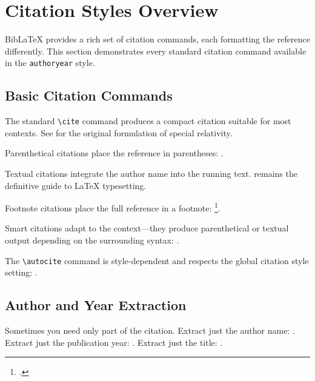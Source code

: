 \documentclass[
    language=english,
    doctype=article,
    institution=none,
]{../../omnilatex}
\begin{document}
\maketitle

\tableofcontents

\section{Citation Styles Overview}
\label{sec:citation-styles}

BibLaTeX provides a rich set of citation commands, each formatting the
reference differently.  This section demonstrates every standard citation
command available in the \texttt{authoryear} style.

\subsection{Basic Citation Commands}

The standard \verb|\cite| command produces a compact citation suitable for
most contexts.  See \cite{einstein1905} for the original formulation of
special relativity.

Parenthetical citations place the reference in parentheses:
\parencite{knuthTeXbook1986}.

Textual citations integrate the author name into the running text.
\textcite{goossensLaTeXCompanion1993} remains the definitive guide to
\LaTeX{} typesetting.

Footnote citations place the full reference in a footnote:
\footcite{mckinneyPythonDataAnalysis2018}.

Smart citations adapt to the context---they produce parenthetical or
textual output depending on the surrounding syntax:
\smartcite{ramalhoFluentPython2015}.

The \verb|\autocite| command is style-dependent and respects the global
citation style setting: \autocite{birdNaturalLanguageProcessing2009}.

\subsection{Author and Year Extraction}

Sometimes you need only part of the citation.  Extract just the author
name: \citeauthor{diracPrinciplesQuantumMechanics1981}.  Extract just the
publication year: \citeyear{mollenhauerHandbuchDieselmotoren2007}.  Extract
just the title: .
\end{document}
